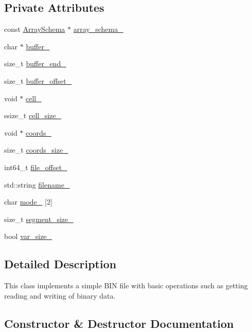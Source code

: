 \subsection*{Private Attributes}
\begin{DoxyCompactItemize}
\item 
const \hyperlink{classArraySchema}{Array\+Schema} $\ast$ \hyperlink{classBINFile_a028698fec2c4c95fec3162c8aa140afa}{array\+\_\+schema\+\_\+}
\item 
char $\ast$ \hyperlink{classBINFile_ac04f57a328c37aeba330851643d86455}{buffer\+\_\+}
\item 
size\+\_\+t \hyperlink{classBINFile_a6638b7bd9a54172d694d9c955ad3aed7}{buffer\+\_\+end\+\_\+}
\item 
size\+\_\+t \hyperlink{classBINFile_a93a5979fd3c9ccf0e58866e49e516890}{buffer\+\_\+offset\+\_\+}
\item 
void $\ast$ \hyperlink{classBINFile_a38d5e4398274c4f8493cbd74b03967d5}{cell\+\_\+}
\item 
ssize\+\_\+t \hyperlink{classBINFile_aa6035d4e2e3877f57c1b15924e22c9d0}{cell\+\_\+size\+\_\+}
\item 
void $\ast$ \hyperlink{classBINFile_a8af11765bb8744748a812e78b15e22ac}{coords\+\_\+}
\item 
size\+\_\+t \hyperlink{classBINFile_ab109a798204ffecf9c85d7d9e8e5c469}{coords\+\_\+size\+\_\+}
\item 
int64\+\_\+t \hyperlink{classBINFile_af357b1564acccf461dfdb846249a35e9}{file\+\_\+offset\+\_\+}
\item 
std\+::string \hyperlink{classBINFile_abcaf9d032fcac353059a72244120e9fa}{filename\+\_\+}
\item 
char \hyperlink{classBINFile_a7f7e6a137b016f6cd533515076982faa}{mode\+\_\+} \mbox{[}2\mbox{]}
\item 
size\+\_\+t \hyperlink{classBINFile_a55f579b9027292fa6f56cb7f0e90f922}{segment\+\_\+size\+\_\+}
\item 
bool \hyperlink{classBINFile_af6d2bb5c8844e38d6631905fd662e8d8}{var\+\_\+size\+\_\+}
\end{DoxyCompactItemize}


\subsection{Detailed Description}
This class implements a simple B\+I\+N file with basic operations such as getting reading and writing of binary data. 

\subsection{Constructor \& Destructor Documentation}
\hypertarget{classBINFile_a05a9debbcd9940f7a40fcd0224b39368}{}
